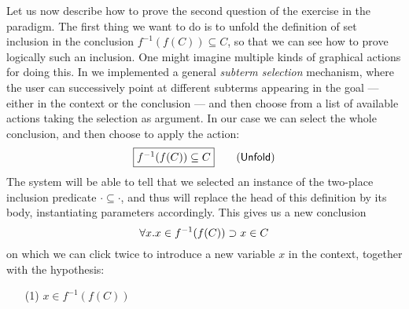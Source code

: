 Let us now describe how to prove the second question of the exercise in the
 paradigm. The first thing we want to do is to unfold the
definition of set inclusion in the conclusion $f^{-1}(f(C)) \subseteq C$, so
that we can see how to prove logically such an inclusion. One might imagine
multiple kinds of graphical actions for doing this. In  we implemented a
general \emph{subterm selection} mechanism, where the user can successively
point at different subterms appearing in the goal --- either in the context or
the conclusion --- and then choose from a list of available actions taking the
selection as argument. In our case we can select the whole conclusion, and then
choose to apply the  action:
$$\fbox{$f^{-1}(f(C)) \subseteq C$} \qquad \text{(\textsf{Unfold})}$$
The system will be able to tell that we
selected an instance of the two-place inclusion predicate $\cdot \subseteq
\cdot$, and thus will replace the head of this definition by its body,
instantiating parameters accordingly. This gives us a new conclusion
$$\forall x. x \in f^{-1}(f(C)) \supset x \in C$$
on which we can click twice to introduce a new variable $x$ in the context,
together with the hypothesis:
\begin{itemize}
  \item[(1)] $x \in f^{-1}(f(C))$
\end{itemize}

